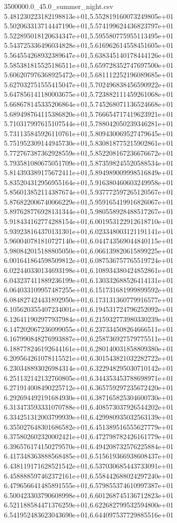 \begin{filecontents*}{3500000.0_45.0_summer_night.csv}
5.481230223182198813e+01,5.552819160073249805e+01
5.502063313714447190e+01,5.574199624436823797e+01
5.522895018120634347e+01,5.595580775955113495e+01
5.543725336496034828e+01,5.616962614558451605e+01
5.564554268932389647e+01,5.638345140178444126e+01
5.585381815525186511e+01,5.659728352747697500e+01
5.606207976368925472e+01,5.681112252196089685e+01
5.627032751555415047e+01,5.702496838456590922e+01
5.647856141180003675e+01,5.723882111459261068e+01
5.668678145335206864e+01,5.745268071136524668e+01
5.689498764115386820e+01,5.766654717419623921e+01
5.710317997615107544e+01,5.788042050239346281e+01
5.731135845926110761e+01,5.809430069527479645e+01
5.751952309144945730e+01,5.830818775215902861e+01
5.772767387362928559e+01,5.852208167236676672e+01
5.793581080675051709e+01,5.873598245520588534e+01
5.814393389175672411e+01,5.894989009998516849e+01
5.835204312956955164e+01,5.916380460603249958e+01
5.856013852114387674e+01,5.937772597265120567e+01
5.876822006740066229e+01,5.959165419916826067e+01
5.897628776928131344e+01,5.980558928488517267e+01
5.918434162774288154e+01,6.001953122912618710e+01
5.939238164370131301e+01,6.023348003121191141e+01
5.960040781810727140e+01,6.044743569044840115e+01
5.980842015188805050e+01,6.066139820615899225e+01
6.001641864598509812e+01,6.087536757765519724e+01
6.022440330134693198e+01,6.108934380424852861e+01
6.043237411889236199e+01,6.130332688526414131e+01
6.064033109957487255e+01,6.151731681999899592e+01
6.084827424431892950e+01,6.173131360779916577e+01
6.105620355407234001e+01,6.194531724796252092e+01
6.126411902977937984e+01,6.215932773980330239e+01
6.147202067236099055e+01,6.237334508264666511e+01
6.167990848276993887e+01,6.258736927579775511e+01
6.188778246192644161e+01,6.280140031858809380e+01
6.209564261078115521e+01,6.301543821032282722e+01
6.230348893026984314e+01,6.322948295030710142e+01
6.251132142132760805e+01,6.344353453788698971e+01
6.271914008490225712e+01,6.365759297235672420e+01
6.292694492191684930e+01,6.387165825304600730e+01
6.313473593331070788e+01,6.408573037926544202e+01
6.334251312003799939e+01,6.429980935032563139e+01
6.355027648301686582e+01,6.451389516555627779e+01
6.375802602320002421e+01,6.472798782426161779e+01
6.396576174150279570e+01,6.494208732576225884e+01
6.417348363888568485e+01,6.515619366938608437e+01
6.438119171628521542e+01,6.537030685443733091e+01
6.458888597462372161e+01,6.558442688024297240e+01
6.479656641485891555e+01,6.579855374610997387e+01
6.500423303790608998e+01,6.601268745136712823e+01
6.521188584471376259e+01,6.622682799532594800e+01
6.541952483623043690e+01,6.644097537729885516e+01

\end{filecontents*}
